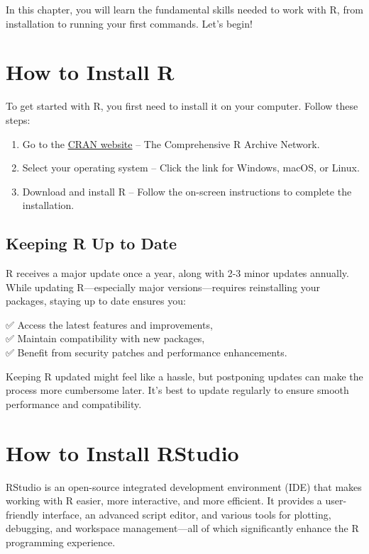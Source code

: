 \documentclass[
]{book}
\providecommand{\tightlist}{%
  \setlength{\itemsep}{0pt}\setlength{\parskip}{0pt}}
\theoremstyle{definition}
\theoremstyle{definition}
\theoremstyle{definition}
\theoremstyle{definition}
\theoremstyle{remark}
\begin{document}
In this chapter, you will learn the fundamental skills needed to work with R, from installation to running your first commands. Let's begin! 🚀

\section{How to Install R}\label{how-to-install-r}

To get started with R, you first need to install it on your computer. Follow these steps:

\begin{enumerate}
\def\labelenumi{\arabic{enumi}.}
\tightlist
\item
  Go to the \href{https://cran.r-project.org}{CRAN website} -- The Comprehensive R Archive Network.\\
\item
  Select your operating system -- Click the link for Windows, macOS, or Linux.\\
\item
  Download and install R -- Follow the on-screen instructions to complete the installation.
\end{enumerate}

\subsection*{Keeping R Up to Date}\label{keeping-r-up-to-date}

R receives a major update once a year, along with 2-3 minor updates annually. While updating R---especially major versions---requires reinstalling your packages, staying up to date ensures you:

✅ Access the latest features and improvements,\\
✅ Maintain compatibility with new packages,\\
✅ Benefit from security patches and performance enhancements.

Keeping R updated might feel like a hassle, but postponing updates can make the process more cumbersome later. It's best to update regularly to ensure smooth performance and compatibility.

\section{How to Install RStudio}\label{how-to-install-rstudio}

RStudio is an open-source integrated development environment (IDE) that makes working with R easier, more interactive, and more efficient. It provides a user-friendly interface, an advanced script editor, and various tools for plotting, debugging, and workspace management---all of which significantly enhance the R programming experience.
\end{document}
